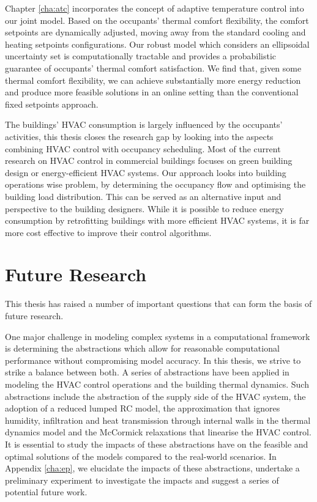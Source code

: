 Chapter \ref{cha:atc} incorporates the concept of adaptive temperature control into our joint model. Based on the occupants' thermal comfort flexibility, the comfort setpoints are dynamically adjusted, moving away from the standard cooling and heating setpoints configurations. Our robust model which considers an ellipsoidal uncertainty set is computationally tractable and provides a probabilistic guarantee of occupants' thermal comfort satisfaction. We find that, given some thermal comfort flexibility, we can achieve substantially more energy reduction and produce more feasible solutions in an online setting than the conventional fixed setpoints approach.

The buildings' HVAC consumption is largely influenced by the occupants' activities, this thesis closes the research gap by looking into the aspects combining HVAC control with occupancy scheduling. Most of the current research on HVAC control in commercial buildings focuses on green building design or energy-efficient HVAC systems. Our approach looks into building operations wise problem, by determining the occupancy flow and optimising the building load distribution. This can be served as an alternative input and perspective to the building designers. While it is possible to reduce energy consumption by retrofitting buildings with more efficient HVAC systems, it is far more cost effective to improve their control algorithms. 

\section{Future Research}

This thesis has raised a number of important questions that can form the basis of future research.

One major challenge in modeling complex systems in a computational framework is determining the abstractions which allow for reasonable computational performance without compromising model accuracy. In this thesis, we strive to strike a balance between both. A series of abstractions have been applied in modeling the HVAC control operations and the building thermal dynamics. Such abstractions include the abstraction of the supply side of the HVAC system, the adoption of a reduced lumped RC model, the approximation that ignores humidity, infiltration and heat transmission through internal walls in the thermal dynamics model and the McCormick relaxations that linearise the HVAC control. It is essential to study the impacts of these abstractions have on the feasible and optimal solutions of the models compared to the real-world scenarios. In Appendix \ref{cha:ep}, we elucidate the impacts of these abstractions, undertake a preliminary experiment to investigate the impacts and suggest a series of potential future work. 

